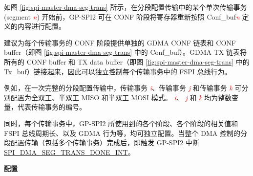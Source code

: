 \documentclass[main\_\_CN.tex]{subfiles}
\begin{document}
如图 \ref{fig:spi-master-dma-seg-trans} 所示，在分段配置传输中的某个单次传输事务 (segment \textcolor{red}{\it{n}}) 开始前，GP-SPI2 可在 CONF 阶段将寄存器重新按照 Conf\_buf\textcolor{red}{\it{n}}  定义的内容进行配置。

建议为每个传输事务的 CONF 阶段提供单独的 GDMA CONF 链表和 CONF buffer（即图 \ref{fig:spi-master-dma-seg-trans} 中的 Conf\_buf）。GDMA TX 链表将所有的 CONF buffer 和 TX data buffer（即图 \ref{fig:spi-master-dma-seg-trans} 中的 Tx\_buf）链接起来，因此可以独立控制每个传输事务中的 FSPI 总线行为。

例如，在一次完整的分段配置传输中，传输事务 \textcolor{red}{\it i}、传输事务 \textcolor{red}{\it j} 和传输事务 \textcolor{red}{\it k} 可分别配置为全双工、半双工 MISO 和半双工 MOSI 模式。 \textcolor{red}{\it i}、 \textcolor{red}{\it j} 和  \textcolor{red}{\it k} 均为整数变量，代表传输事务的编号。

同时，每个传输事务中，GP-SPI2 所使用到的各个阶段、各个阶段的相关值和 FSPI 总线周期长、以及 GDMA 行为等，均可独立配置。当整个 DMA 控制的分段配置传输（包括多个传输事务）完成后，即触发 GP-SPI2 中断 \hyperref[int:SPIDMASEGTRANSDONEINT]{SPI\_DMA\_SEG\_TRANS\_DONE\_INT}。

\textbf{配置}
\end{document}

